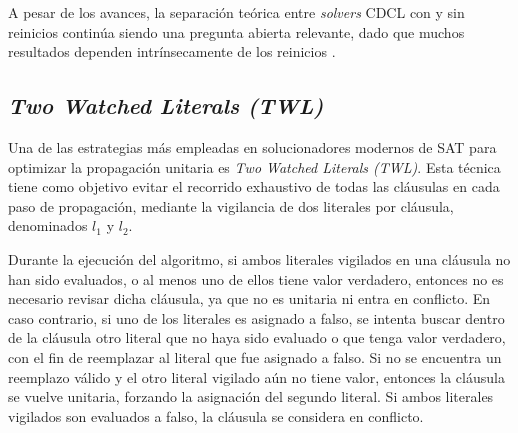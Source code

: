 

A pesar de los avances, la separación teórica entre \textit{solvers} CDCL con y sin reinicios continúa siendo una pregunta abierta relevante, dado que muchos resultados dependen intrínsecamente de los reinicios \cite{zulkoski2018understanding}.

\subsection{\textit{Two Watched Literals (TWL)}}
\label{subsec:twl}

Una de las estrategias m\'as empleadas en solucionadores modernos de SAT para optimizar la propagaci\'on unitaria es \textit{Two Watched Literals (TWL)}. Esta t\'ecnica tiene como objetivo evitar el recorrido exhaustivo de todas las cl\'ausulas en cada paso de propagaci\'on, mediante la vigilancia de dos literales por cl\'ausula, denominados $l_1$ y $l_2$.

Durante la ejecuci\'on del algoritmo, si ambos literales vigilados en una cl\'ausula no han sido evaluados, o al menos uno de ellos tiene valor verdadero, entonces no es necesario revisar dicha cl\'ausula, ya que no es unitaria ni entra en conflicto. En caso contrario, si uno de los literales es asignado a falso, se intenta buscar dentro de la cl\'ausula otro literal que no haya sido evaluado o que tenga valor verdadero, con el fin de reemplazar al literal que fue asignado a falso. Si no se encuentra un reemplazo v\'alido y el otro literal vigilado a\'un no tiene valor, entonces la cl\'ausula se vuelve unitaria, forzando la asignaci\'on del segundo literal. Si ambos literales vigilados son evaluados a falso, la cl\'ausula se considera en conflicto.

